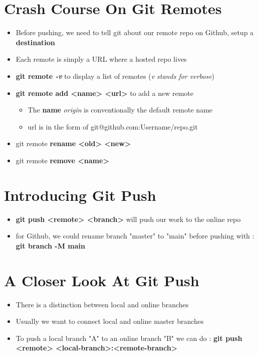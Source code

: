\documentclass{report}
\newcommand{\warning}{
	{\fontencoding{U}\fontfamily{futs}\selectfont\char 66\relax}
}
\begin{document}
\section{Crash Course On Git Remotes}

\begin{itemize}
	\item Before pushing, we need to tell git about our remote repo on Github, setup a \textbf{destination} 
	\item Each remote is simply a URL where a hosted repo lives 
	\item \textbf{git remote \textit{-v}} to display a list of remotes (\textit{v stands for verbose}) 
	\item \textbf{git remote add <name> <url>} to add a new remote
		\begin{itemize}
			\item The \textbf{name} \textit{origin} is conventionally the default remote name 
			\item \warning url is in the form of git@github.com:Username/repo.git
		\end{itemize}
	\item git remote \textbf{rename <old> <new>} 
	\item git remote \textbf{remove <name>}  
\end{itemize}


\section{Introducing Git Push}

\begin{itemize}
	\item \textbf{git push <remote> <branch>} will push our work to the online repo 
	\item \warning for Github, we could rename branch "master" to "main" before pushing with : \textbf{git branch -M main} 
\end{itemize}


\section{A Closer Look At Git Push}

\begin{itemize}
	\item There is a distinction between local and online branches 
	\item Usually we want to connect local and online master branches 
	\item To push a local branch "A" to an online branch "B" we can do : \textbf{git push <remote> <local-branch>:<remote-branch>} 
\end{itemize}
\end{document}
